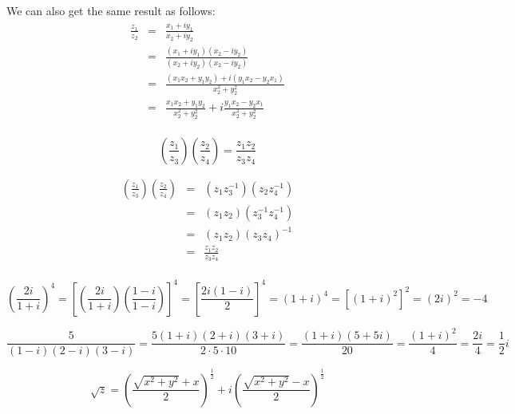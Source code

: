\documentclass[letterpaper,12pt,fleqn]{article}
\begin{document}
We can also get the same result as follows:
\begin{eqnarray*}
\frac{z_1}{z_2} &=& \frac{x_1+iy_1}{x_2+iy_2} \\
    &=& \frac{(x_1+iy_1)(x_2-iy_2)}{(x_2+iy_2)(x_2-iy_2)} \\
    &=& \frac{(x_1x_2+y_1y_2)+i(y_1x_2-y_2x_1)}{x_2^2+y_2^2} \\
    &=& \frac{x_1x_2+y_1y_2}{x_2^2+y_2^2}+i\frac{y_1x_2-y_2x_1}{x_2^2+y_2^2} \\
\end{eqnarray*}

\begin{theorem}
\[\left(\frac{z_1}{z_3}\right)\left(\frac{z_2}{z_4}\right)=
    \frac{z_1z_2}{z_3z_4}\]
\end{theorem}

\begin{theproof}
\begin{eqnarray*}
\left(\frac{z_1}{z_3}\right)\left(\frac{z_2}{z_4}\right) &=&
    (z_1z_3^{-1})(z_2z_4^{-1}) \\
    &=& (z_1z_2)(z_3^{-1}z_4^{-1}) \\
    &=& (z_1z_2)(z_3z_4)^{-1} \\
    &=& \frac{z_1z_2}{z_3z_4} \\
\end{eqnarray*}
\end{theproof}

\begin{example}
\[\left(\frac{2i}{1+i}\right)^4=
    \left[\left(\frac{2i}{1+i}\right)\left(\frac{1-i}{1-i}\right)\right]^4=
    \left[\frac{2i(1-i)}{2}\right]^4=(1+i)^4=[(1+i)^2]^2=(2i)^2=-4\]
\end{example}

\newpage

\begin{example}
\[\frac{5}{(1-i)(2-i)(3-i)}=\frac{5(1+i)(2+i)(3+i)}{2\cdot5\cdot10}=
    \frac{(1+i)(5+5i)}{20}=\frac{(1+i)^2}{4}=\frac{2i}{4}=\frac{1}{2}i\]
\end{example}

\begin{theorem}
\listbreak
\[\sqrt{z}=\left(\frac{\sqrt{x^2+y^2}+x}{2}\right)^{\frac{1}{2}}+
    i\left(\frac{\sqrt{x^2+y^2}-x}{2}\right)^{\frac{1}{2}}\]
\end{theorem}
\end{document}
